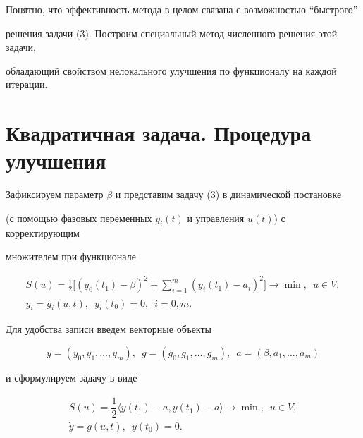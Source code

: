 Понятно, что эффективность метода в целом связана с возможностью ``быстрого''


решения задачи (3). Построим специальный метод численного решения этой задачи,


обладающий свойством нелокального улучшения по функционалу на каждой итерации.





\section{Квадратичная задача. Процедура улучшения}





Зафиксируем параметр $\beta$ и представим задачу (3) в динамической постановке


(с помощью фазовых переменных $y_{i}(t)$ и управления $u(t)$) с корректирующим


множителем при функционале


\begin{gather*}


S(u)=\frac{1}{2}\bigg[(y_{0}(t_{1})-\beta)^{2}+


\sum_{i=1}^{m}(y_{i}(t_{1})-a_{i})^{2}\bigg]\rightarrow\min,\ \;u\in V, \\


%


\Dot{y_{i}}=g_{i}(u,t),\ \;y_{i}(t_{0})=0,\ \;i=\overline{0,m}.


\end{gather*}





Для удобства записи введем векторные объекты


$$


y=(y_{0},y_{1},\dotsc,y_{m}),


\ \;g=(g_{0},g_{1},\dotsc,g_{m}),\ \;a=(\beta,a_{1},\dotsc,a_{m})


$$


и сформулируем задачу в виде


\begin{equation}


\begin{array}{c}


S(u)=\dfrac{1}{2}\langle y(t_{1})-a,y(t_{1})-a\rangle


\rightarrow \min,\ \;u\in V, \\


%


\Dot{y}=g(u,t),\ \;y(t_{0})=0.


\end{array}


\end{equation}


